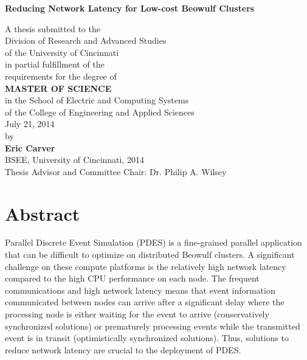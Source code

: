 \documentclass[11pt]{book}
\begin{document}
\thispagestyle{empty}

\doublespacing

\vspace*{0.5in}

\begin{center}
  \LARGE{\textbf{Reducing Network Latency for Low-cost Beowulf Clusters}}

  \vspace*{0.4in}

  {\large A thesis submitted to the\\[0.20in]
    Division of Research and Advanced Studies\\
    of the University of Cincinnati\\[0.20in]
    in partial fulfillment of the\\
    requirements for the degree of\\[0.20in]
    {\bf MASTER OF SCIENCE}\\[0.20in]
    in the School of Electric and Computing Systems\\
    of the College of Engineering and Applied
    Sciences\\[0.20in]
    July 21, 2014\\[0.20in]
    by\\[0.20in]
    {\bf Eric Carver}\\
    BSEE, University of
    Cincinnati, 2014\\}
  \vspace{0.5in}
  {\large Thesis Advisor and Committee Chair:  Dr. Philip A. Wilsey}
\end{center}

\clearpage

\setcounter{page}{1}
\clearpage

\chapter*{Abstract}

Parallel Discrete Event Simulation (PDES) is a fine-grained parallel application that can
be difficult to optimize on distributed Beowulf clusters.  A significant challenge on
these compute platforms is the relatively high network latency compared to the high CPU
performance on each node.  The frequent communications and high network latency means that
event information communicated between nodes can arrive after a significant delay where
the processing node is either waiting for the event to arrive (conservatively synchronized
solutions) or prematurely processing events while the transmitted event is in transit
(optimistically synchronized solutions).  Thus, solutions to reduce network latency are
crucial to the deployment of PDES.
\end{document}
